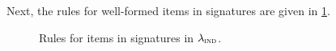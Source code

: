Next, the rules for well-formed items in signatures are given in
\cref{fig:lambdaind-item-rules}. 

\begin{figure}[h]
  \caption{Rules for items in signatures in $\lambda_{\textsc{ind}}$.}
  \label{fig:lambdaind-item-rules}
\end{figure}

